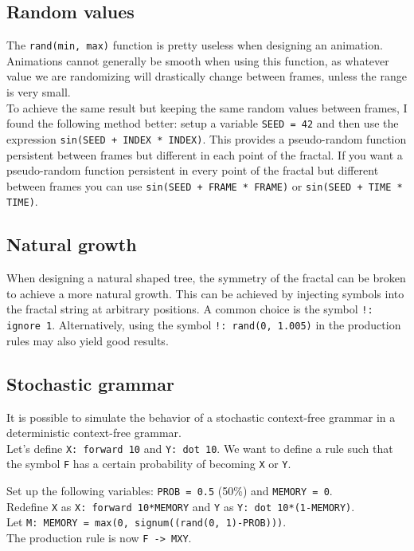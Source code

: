 \documentclass[a4paper]{article}
\begin{document}
\subsection{Random values}

The \texttt{rand(min, max)} function is pretty useless when designing an animation.
Animations cannot generally be smooth when using this function, as whatever value we are randomizing
will drastically change between frames, unless the range is very small. \\
To achieve the same result but keeping the same random values between frames,
I found the following method better: setup a variable \texttt{SEED = 42} and then use
the expression \texttt{sin(SEED + INDEX * INDEX)}. This provides a pseudo-random function
persistent between frames but different in each point of the fractal.
If you want a pseudo-random function persistent in every point of the fractal but different
between frames you can use \texttt{sin(SEED + FRAME * FRAME)} or \texttt{sin(SEED + TIME * TIME)}.

\subsection{Natural growth}

When designing a natural shaped tree, the symmetry of the fractal can be broken
to achieve a more natural growth. This can be achieved by injecting
symbols into the fractal string at arbitrary positions.
A common choice is the symbol \texttt{!: ignore 1}.
Alternatively, using the symbol \texttt{!: rand(0, 1.005)} in the production rules may also yield good results.

\subsection{Stochastic grammar}

It is possible to simulate the behavior of a stochastic context-free grammar
in a deterministic context-free grammar. \\
Let's define \texttt{X: forward 10} and \texttt{Y: dot 10}.
We want to define a rule such that the symbol \texttt{F} has a certain probability of becoming \texttt{X}
or \texttt{Y}.

Set up the following variables: \texttt{PROB = 0.5} (50\%) and \texttt{MEMORY = 0}. \\
Redefine \texttt{X} as \texttt{X: forward 10*MEMORY} and \texttt{Y} as \texttt{Y: dot 10*(1-MEMORY)}. \\
Let \texttt{M: MEMORY = max(0, signum((rand(0, 1)-PROB)))}. \\
The production rule is now \texttt{F -> MXY}.
\end{document}
